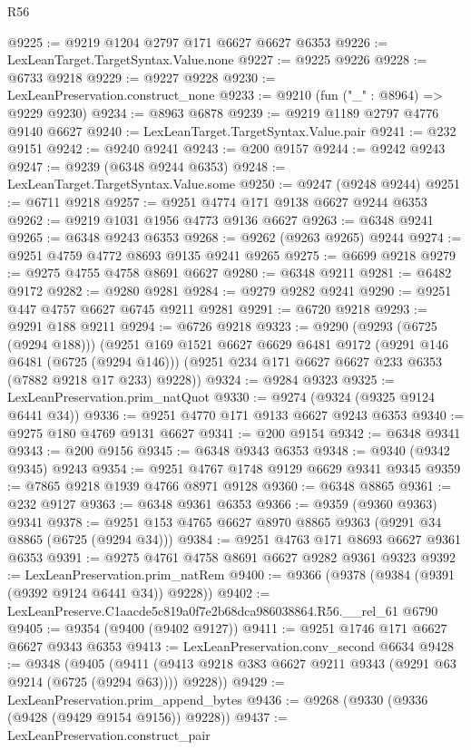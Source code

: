 \begin{lexlean}{R56}
\begin{coremodule}
@9225 := @9219 @1204 @2797 @171 @6627 @6627 @6353
@9226 := LexLeanTarget.TargetSyntax.Value.none
@9227 := @9225 @9226
@9228 := @6733 @9218
@9229 := @9227 @9228
@9230 := LexLeanPreservation.construct_none
@9233 := @9210 (fun ("_" : @8964) => @9229 @9230)
@9234 := @8963 @6878
@9239 := @9219 @1189 @2797 @4776 @9140 @6627
@9240 := LexLeanTarget.TargetSyntax.Value.pair
@9241 := @232 @9151
@9242 := @9240 @9241
@9243 := @200 @9157
@9244 := @9242 @9243
@9247 := @9239 (@6348 @9244 @6353)
@9248 := LexLeanTarget.TargetSyntax.Value.some
@9250 := @9247 (@9248 @9244)
@9251 := @6711 @9218
@9257 := @9251 @4774 @171 @9138 @6627 @9244 @6353
@9262 := @9219 @1031 @1956 @4773 @9136 @6627
@9263 := @6348 @9241
@9265 := @6348 @9243 @6353
@9268 := @9262 (@9263 @9265) @9244
@9274 := @9251 @4759 @4772 @8693 @9135 @9241 @9265
@9275 := @6699 @9218
@9279 := @9275 @4755 @4758 @8691 @6627
@9280 := @6348 @9211
@9281 := @6482 @9172
@9282 := @9280 @9281
@9284 := @9279 @9282 @9241
@9290 := @9251 @447 @4757 @6627 @6745 @9211 @9281
@9291 := @6720 @9218
@9293 := @9291 @188 @9211
@9294 := @6726 @9218
@9323 := @9290
    (@9293 (@6725 (@9294 @188)))
    (@9251
      @169
      @1521
      @6627
      @6629
      @6481
      @9172
      (@9291 @146 @6481 (@6725 (@9294 @146)))
      (@9251 @234 @171 @6627 @6627 @233 @6353 (@7882 @9218 @17 @233) @9228))
@9324 := @9284 @9323
@9325 := LexLeanPreservation.prim_natQuot
@9330 := @9274 (@9324 (@9325 @9124 @6441 @34))
@9336 := @9251 @4770 @171 @9133 @6627 @9243 @6353
@9340 := @9275 @180 @4769 @9131 @6627
@9341 := @200 @9154
@9342 := @6348 @9341
@9343 := @200 @9156
@9345 := @6348 @9343 @6353
@9348 := @9340 (@9342 @9345) @9243
@9354 := @9251 @4767 @1748 @9129 @6629 @9341 @9345
@9359 := @7865 @9218 @1939 @4766 @8971 @9128
@9360 := @6348 @8865
@9361 := @232 @9127
@9363 := @6348 @9361 @6353
@9366 := @9359 (@9360 @9363) @9341
@9378 := @9251 @153 @4765 @6627 @8970 @8865 @9363 (@9291 @34 @8865 (@6725 (@9294 @34)))
@9384 := @9251 @4763 @171 @8693 @6627 @9361 @6353
@9391 := @9275 @4761 @4758 @8691 @6627 @9282 @9361 @9323
@9392 := LexLeanPreservation.prim_natRem
@9400 := @9366 (@9378 (@9384 (@9391 (@9392 @9124 @6441 @34)) @9228))
@9402 := LexLeanPreserve.C1aacde5c819a0f7e2b68dca986038864.R56.__rel_61 @6790
@9405 := @9354 (@9400 (@9402 @9127))
@9411 := @9251 @1746 @171 @6627 @6627 @9343 @6353
@9413 := LexLeanPreservation.conv_second @6634
@9428 := @9348
    (@9405 (@9411 (@9413 @9218 @383 @6627 @9211 @9343 (@9291 @63 @9214 (@6725 (@9294 @63)))) @9228))
@9429 := LexLeanPreservation.prim_append_bytes
@9436 := @9268 (@9330 (@9336 (@9428 (@9429 @9154 @9156)) @9228))
@9437 := LexLeanPreservation.construct_pair

\end{coremodule}
\end{lexlean}
